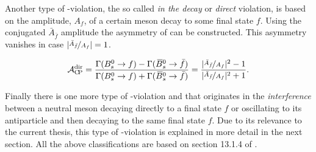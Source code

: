Another type of \CP-violation, the so called {\it in the decay} or {\it direct} \CP violation, is based on the
amplitude, $A_f$, of a certain meson decay to some final state $f$.
Using the \CP conjugated $\bar{A}_{\bar{f}}$ amplitude the asymmetry of  can be constructed.
This asymmetry vanishes in case $|\nicefrac{\bar{A}_{\bar{f}}}{A_f}| = 1$.

\begin{equation}
  \centering
  \Acp{\text{dir}} = \frac{\Gamma(\Bs \rightarrow f) - \Gamma(\Bsb \rightarrow \bar{f})} {\Gamma(\Bs \rightarrow f) + \Gamma(\Bsb \rightarrow \bar{f})}
                   = \frac{ |\nicefrac{\bar{A}_{\bar{f}}}{A_f}|^2 - 1}{|\nicefrac{\bar{A}_{\bar{f}}}{A_f}|^2 + 1}.
\label{cpv_decay}
\end{equation}

Finally there is one more type of \CP-violation and that originates in the {\it interference} between
a neutral meson decaying directly to a final state $f$ or oscillating to its antiparticle and then decaying
to the same final state $f$. Due to its relevance to the current thesis, this type of \CP-violation is explained
in more detail in the next section. All the above classifications are based on section 13.1.4 of \cite{PDG}.
